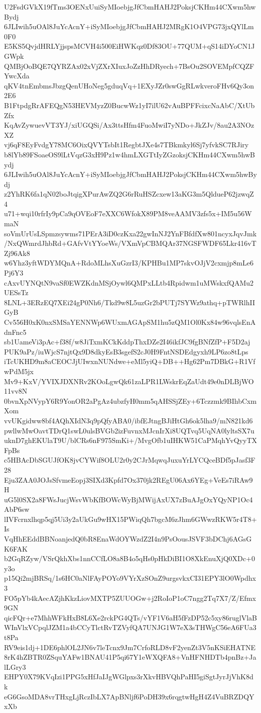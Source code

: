 U2FsdGVkX19fTms3OENxUuiSyMIoebjgJfCbmHAHJ2PoksjCKHm44CXwm5hwBydj
6JLIwih5uOAl8JuYcAcnY+iSyMIoebjgJfCbmHAHJ2MRgK1O4VPG73jxQYlLm0F0
E5KS5QvjdHRLYjjspsMCVH4i500EiHWKqz0Df83OU+77QUM+qS14iDYoCN1JGWpk
QMBjOoBQE7QYRZAx02xVjZXrXIuxJoZzHhDRyech+7BsOu2SOVEMpfCQZFYwcXda
qKV4tnEmbmsJbzgQenUHoNeg5gduqVq+1EXyJZr0swGgRLwkveroFHv6Qy3on2E6
B1FtpdgRrAFEQgN53HEVMyzZ0BucwWz1yI7ilU62vAuBPFFcixcNaAbC/XtUbZfx
KqAvZywuevVT3YJ/xiUGQSi/Ax3ttsHfm4FuoMwiI7yNDo+JkZJv/8au2A3NOzXZ
vj6qF8EyFvdgY78MC6OixQVYTsbIt1RegbtJXe4s7TBkmkyl6Sj7yfvkSC7RJiry
b8lYb89FSoaeOS9lLtVqzG3xH9Pz1w4hmLXGTtIyZGzoksjCKHm44CXwm5hwBydj
6JLIwih5uOAl8JuYcAcnY+iSyMIoebjgJfCbmHAHJ2PoksjCKHm44CXwm5hwBydj
z2YhRK6fa1qN02boJtqigXPurAwZQ2G6rRuHSZcxew13aKG3m5QldueP62jzwqZ4
u71+wqi10rfrIy9pCa9qOVEoF7eXXC6WfokX89PM8veAAMV3zfs5x+IM5u56WmaN
soVmUrUsLSpmzsywms71PErA3iD0czKxa22gwInNJ2YnFBfdfXw801ncyxJqvJmk
/NxQWmrdJhbRd+GAfvVtYYoeWs/VXmVpCBMQAr37NGSFWDF65Lkr416vTZj96Ak8
w6Yhz3yftWDYMQnA+RdoMLhsXuGzrI3/KPHBu1MP7skvOJjV2cxmjp8mLe6Pj6Y3
cAxvUYNQtN9vaSf0EWZKdnMSjOywl6QMPxLLtb4Rpidwm1uMWskxfQAMu2UESsTz
8LNL+3ERzEQ7XEi24gP0Nh6/Tkd9w8L5uzGr2bPUTj7SYWz9athq+pTWRlhIIGyB
Cv556H0xK0nxSMSaYENNWp6WUxmAGApSM1hu5zQM1Ol0Kx84w96vqlsEnAdnFnc5
sb1UameVi3pAc+f38f/w8JiTxmKCkKddpThxDZe2I46ikfJC9fgBNfZfP+F5D2aj
PUK9aPz/iuWjcS7njtQx9D8dkyEsB3sgefS2cJ0H9FntNSDEdgyxh9LP6zo8tLps
iTcUKHD9m8aCEOCJjUIwxnNUNdwe+eMl5yiQ+DB++Hg62Pm7DBkG+R1VfwPdM5jx
Mv9+KxV/YVIXJDXNRv2KOoLgwQk61zaLPR1LWskrEqZaUdt49e0nDLBjWO11vv8N
0bvnXpNVypY6R9YonOR2aPgAz4ubzfyH0mm5qAHSSjZEy+6Tczzmk9BIhbCxmXom
vvUKgidww8bf4AQhXIdN3q9pQfyABA0/ibfEJtngBJiHtGh6ok5lha9/mN821kd6
pwllwMwOavtTDrQ1swL0ulsBVGb2izFuvnxMJcnIrXi8UQTvq5UqNA0lyltsSX7u
uknD7ghEKUlaT9U/blCRs6nF975SmKi+/MvgOfb1uIHKW51CaPMqhYvQyyTXFpBs
c5HBAcDbSGUJfOK8jvCYWif8OLU2r0y2CJrMqwqJuxuYrLYCQceBDf5pJasf3F28
Eju3ZAA0JOJsSfvmeEopj3SIXd3Kpfd7Ox370jk2REgU06Ax6YEg+VeEs7iRAw9H
uG5l0SX2a8FWsJucjWsvWbKfBOWcWyBjMWijAxUX7zBuAJgOxYQyNP1Oc4AbP6sw
lIVFcrnxlhqp5qj5Ui3y2aUkGu9wHX15PWiqQh7bgcM6zJhm6GWwzRKW5r4T8+Is
VqHhEEddBBNoanjedQ0bR8EnaWdOYWzdZ2I4n9PsOousJSVF3bDChj6AGsGK6FAK
b2GqRZyw/VSrQkhXbs1nnCCfLO8a8B4o5qHs0pHkDiBI1O8XkEnuXjQ0XDc+0y3o
p15Qi2mjBRSq/1s6HC0aNlFAyPOYo9VYrXzSOnZ9urgsvkxCI31EPY3lO0Wpdhx3
FO5pYb4kAecAZjhKkzLiovMXTP5ZUUOGw+j2RoIoP1oC7ngg2Tq7X7/Z/Efmx9GN
qicFQr+e7MhhWFkHxB8L6Xe2rckPG4QTs/vYF1V6aH5fFzDP52c5xy86ruglVlaB
WInVlxVCpqlJZM1a4bCCyTlctRvTZVyfQA7UNJG1W7eX3sTHWgC56eA6FUa3t8Pa
RV9eis1dj+1DE6phlOL2JN6v7leTcnx9Jm7CrfoRLD8vF2yenZt3V5nKSiEHATNE
8rK4hZBTR0ZSquYAFw1BNAU41P5qi67Y1eWXQFA8+VnHFNHDTb4pnBz+JalLGry3
EHPY0X79KVqIzi1PPG5xHfJaIJgWGlpxs3rXkvHBVQhPaHI5giSgtJyrJjVhK8dk
eG6GsoMDA8vrTHxgLjRczIbLX7ApBNljf6PoDH39x6rqgtwHgH4Z4VuBRZDQYxXb
